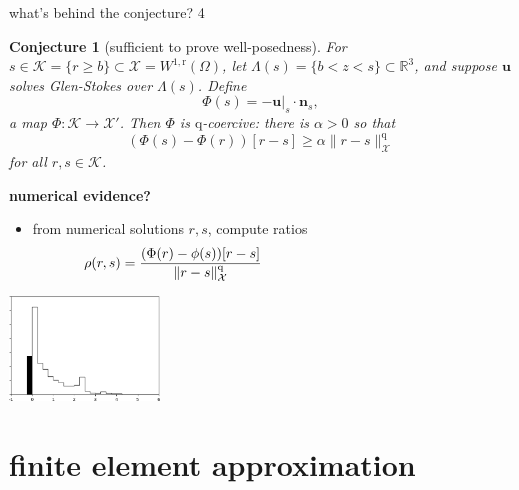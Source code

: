 \documentclass[10pt,dvipsnames]{beamer}
\theoremstyle{theorem}
\newtheorem*{conjecture}{Conjecture}
\newcommand{\bn}{\mathbf{n}}
\newcommand{\bu}{\mathbf{u}}
\newcommand{\cK}{\mathcal{K}}
\newcommand{\cX}{\mathcal{X}}
\newcommand{\RR}{\mathbb{R}}
\newcommand{\qq}{\mathrm{q}}
\newcommand{\rr}{\mathrm{r}}
\begin{document}
\begin{frame}{what's behind the conjecture? 4}

\bigskip
\begin{conjecture}[sufficient to prove well-posedness]
For $s \in \cK = \{r \ge b\} \subset \cX = W^{1,\rr}(\Omega)$, let $\Lambda(s) = \{b<z<s\} \subset \RR^3$, and suppose $\bu$ solves Glen-Stokes over $\Lambda(s)$.  Define
	$$\Phi(s) = - \bu|_s \cdot \bn_s,$$
a map $\Phi:\cK \to \cX'$.  Then $\Phi$ is $\qq$-coercive: there is $\alpha>0$ so that
	$$\left(\Phi(s) - \Phi(r)\right)[r-s] \ge \alpha \|r-s\|_\cX^\qq$$
for all $r,s\in\cK$.
\end{conjecture}

\bigskip
\footnotesize
\noindent \textbf{numerical evidence?}

\begin{itemize}
\item from numerical solutions $r,s$, compute ratios
    $$\rho(r,s) = \frac{(\Phi(r)-\phi(s))[r-s]}{\|r-s\|_\cX^\qq} \hspace{50mm}$$
\end{itemize}

\vspace{-20mm}
\hfill \includegraphics[width=0.3\textwidth]{smoothratios} \qquad
\end{frame}


\section{finite element approximation}
\end{document}
